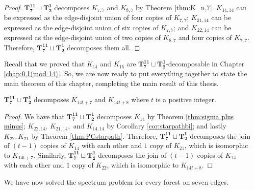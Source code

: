 \begin{proof}
    $\mathbf{T_{7}^{11}}\sqcup\mathbf{T_{2}^{1}}$ decomposes $K_{7,7}$ and $K_{8,7}$ by Theorem \ref{thm:K_n,7}. $K_{14,14}$ can be expressed as the edge-disjoint union of four copies of $K_{7,7}$; $K_{21,14}$ can be expressed as the edge-disjoint union of six copies of $K_{7,7}$; and $K_{22,14}$ can be expressed as the edge-disjoint union of two copies of $K_{8,7}$ and four copies of $K_{7,7}$. Therefore, $\mathbf{T_{7}^{11}}\sqcup\mathbf{T_{2}^{1}}$ decomposes them all.

\end{proof}
Recall that we proved that $K_{14}$ and $K_{15}$ are $\mathbf{T_{7}^{11}}\sqcup\mathbf{T_{2}^{1}}$-decomposable in Chapter \ref{chap:0,1(mod 14)}. So, we are now ready to put everything together to state the main theorem of this chapter, completing the main result of this thesis.
\begin{thm}
$\mathbf{T_{7}^{11}}\sqcup\mathbf{T_{2}^{1}}$ decomposes $K_{14t+7}$ and $K_{14t+8}$ where $t$ is a positive integer. 
\end{thm}
\begin{proof}
We have that $\mathbf{T_{7}^{11}}\sqcup\mathbf{T_{2}^{1}}$ decomposes $K_{14}$ by Theorem \ref{thm:sigma plus minus}; $K_{22,14}$, $K_{21,14},\text{ and }K_{14,14}$ by Corollary \ref{cor:starpathbi}; and lastly $K_{22},K_{21}$ by Theorem \ref{thm:PCstarpath}.
\newline\newline
Therefore, $\mathbf{T_{7}^{11}}\sqcup\mathbf{T_{2}^{1}}$ decomposes the join of $(t-1)$ copies of $K_{14}$ with each other and $1$ copy of $K_{21}$, which is isomorphic to $K_{14t+7}$. Similarly, $\mathbf{T_{7}^{11}}\sqcup\mathbf{T_{2}^{1}}$ decomposes the join of $(t-1)$ copies of $K_{14}$ with each other and $1$ copy of $K_{22}$, which is isomorphic to $K_{14t+8}$.

\end{proof}

We have now solved the spectrum problem for every forest on seven edges. 